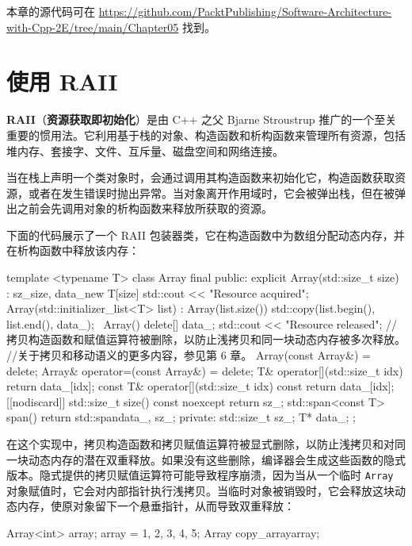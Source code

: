 本章的源代码可在 \href{https://github.com/PacktPublishing/Software-Architecture-with-Cpp-2E/tree/main/Chapter05}{https://github.com/PacktPublishing/Software-Architecture-with-Cpp-2E/tree/main/Chapter05} 找到。

\section{使用 RAII}

\textbf{RAII}（\textbf{资}\textbf{源获取即初始化}）是由 C++ 之父 Bjarne Stroustrup 推广的一个至关重要的惯用法。它利用基于栈的对象、构造函数和析构函数来管理所有资源，包括堆内存、套接字、文件、互斥量、磁盘空间和网络连接。

\label{idx:435}
当在栈上声明一个类对象时，会通过调用其构造函数来初始化它，构造函数获取资源，或者在发生错误时抛出异常。当对象离开作用域时，它会被弹出栈，但在被弹出之前会先调用对象的析构函数来释放所获取的资源。

下面的代码展示了一个 RAII 包装器类，它在构造函数中为数组分配动态内存，并在析构函数中释放该内存：

\begin{codebox}[cpp]
template <typename T>
class Array final {
public:
    explicit Array(std::size_t size) : sz_{size}, data_{new T[size]} {
    std::cout << "Resource acquired\n";
    }
    Array(std::initializer_list<T> list) : Array(list.size()) {
        std::copy(list.begin(), list.end(), data_);
    }
    ~Array() {
        delete[] data_;
        std::cout << "Resource released\n";
    }
    //拷贝构造函数和赋值运算符被删除，以防止浅拷贝和同一块动态内存被多次释放。
    //关于拷贝和移动语义的更多内容，参见第 6 章。
    Array(const Array&) = delete;
    Array& operator=(const Array&) = delete;
    T& operator[](std::size_t idx) { return data_[idx]; }
    const T& operator[](std::size_t idx) const { return data_[idx]; }
    [[nodiscard]] std::size_t size() const noexcept { return sz_; }
    std::span<const T> span() { return std::span{data_, sz_}; }
private:
    std::size_t sz_;
    T* data_;
};
\end{codebox}

在这个实现中，拷贝构造函数和拷贝赋值运算符被显式删除，以防止浅拷贝和对同一块动态内存的潜在双重释放。如果没有这些删除，编译器会生成这些函数的隐式版本。隐式提供的拷贝赋值运算符可能导致程序崩溃，因为当从一个临时 \texttt{Array} 对象赋值时，它会对内部指针执行浅拷贝。当临时对象被销毁时，它会释放这块动态内存，使原对象留下一个悬垂指针，从而导致双重释放：

\begin{codebox}[text]
Array<int> array{};
array = {1, 2, 3, 4, 5};
Array copy_array{array};
\end{codebox}

